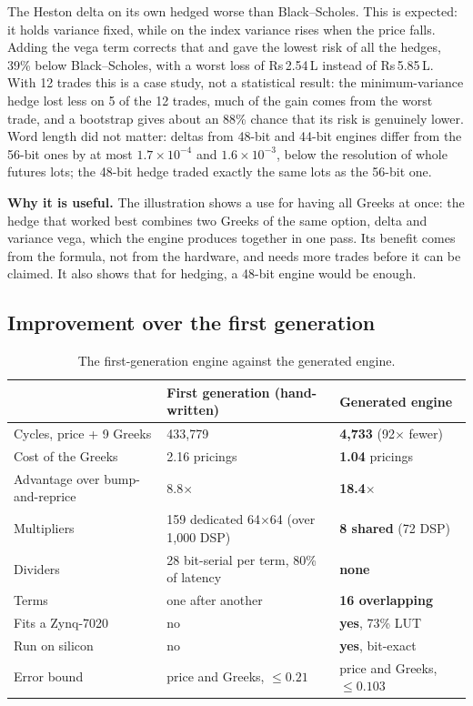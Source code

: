 \documentclass[11pt,a4paper]{article}
\newcommand{\useful}[1]{\par\noindent\textbf{\textcolor{accent}{Why it is useful.}} #1\par}
\newcommand{\rupee}{Rs\,}
\begin{document}
The Heston delta on its own hedged worse than Black--Scholes. This is expected: it
holds variance fixed, while on the index variance rises when the price falls. Adding
the vega term corrects that and gave the lowest risk of all the hedges, 39\% below
Black--Scholes, with a worst loss of \rupee2.54\,L instead of \rupee5.85\,L. With 12
trades this is a case study, not a statistical result: the minimum-variance hedge lost
less on 5 of the 12 trades, much of the gain comes from the worst trade, and a bootstrap
gives about an 88\% chance that its risk is genuinely lower. Word length did not
matter: deltas from 48-bit and 44-bit engines differ from the 56-bit ones by at most
$1.7\times10^{-4}$ and $1.6\times10^{-3}$, below the resolution of whole futures lots;
the 48-bit hedge traded exactly the same lots as the 56-bit one.

\useful{The illustration shows a use for having all Greeks at once: the hedge that
worked best combines two Greeks of the same option, delta and variance vega, which the
engine produces together in one pass. Its benefit comes from the formula, not from the
hardware, and needs more trades before it can be claimed. It also shows that for
hedging, a 48-bit engine would be enough.}

\subsection{Improvement over the first generation}
\begin{table}[H]
\centering
\small
\begin{tabularx}{\textwidth}{@{}l Y Y@{}}
\toprule
& \textbf{First generation (hand-written)} & \textbf{Generated engine}\\
\midrule
Cycles, price + 9 Greeks & 433,779 & \textbf{4,733} (92$\times$ fewer)\\
Cost of the Greeks & 2.16 pricings & \textbf{1.04} pricings\\
Advantage over bump-and-reprice & 8.8$\times$ & \textbf{18.4$\times$}\\
Multipliers & 159 dedicated 64$\times$64 (over 1,000 DSP) & \textbf{8 shared} (72 DSP)\\
Dividers & 28 bit-serial per term, 80\% of latency & \textbf{none}\\
Terms & one after another & \textbf{16 overlapping}\\
Fits a Zynq-7020 & no & \textbf{yes}, 73\% LUT\\
Run on silicon & no & \textbf{yes}, bit-exact\\
Error bound & price and Greeks, $\le 0.21$ & price and Greeks, $\le 0.103$\\
\bottomrule
\end{tabularx}
\caption{The first-generation engine against the generated engine.}
\end{table}
\end{document}

